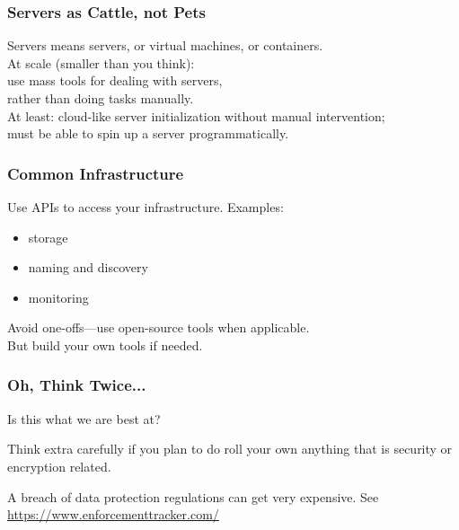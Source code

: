 \begin{frame}
\frametitle{Servers as Cattle, not Pets}

\large
\begin{changemargin}{2cm}
Servers means servers, or virtual machines, or containers.\\[1em]

At scale (smaller than you think):\\
use mass tools for dealing with servers, \\
rather than doing tasks manually. \\[1em]

At least: cloud-like server initialization without manual intervention;\\
must be able to spin up a server programmatically.
\end{changemargin}

\end{frame}



\begin{frame}
\frametitle{Common Infrastructure}

\large
\begin{changemargin}{1cm}
Use APIs to access your infrastructure. Examples:

\begin{itemize}
\item storage
\item naming and discovery
\item monitoring
\end{itemize}

Avoid one-offs---use open-source tools when applicable.\\
But build your own tools if needed.
\end{changemargin}

\end{frame}

\begin{frame}
\frametitle{Oh, Think Twice...}

Is this what we are best at?

Think extra carefully if you plan to do roll your own anything that is security or encryption related.

A breach of data protection regulations can get very expensive. See \url{https://www.enforcementtracker.com/}

\end{frame}



